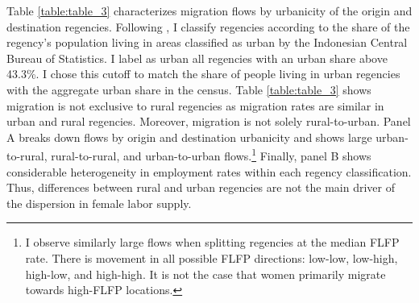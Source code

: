 Table \ref{table:table_3} characterizes migration flows by urbanicity of the origin and destination regencies. Following \cite{Bryan2019},  I classify regencies according to the share of the regency's population living in areas classified as urban by the Indonesian Central Bureau of Statistics. I label as urban all regencies with an urban share above 43.3\%. 
I chose this cutoff to match the share of people living in urban regencies with the aggregate urban share in the census. Table \ref{table:table_3} shows migration is not exclusive to rural regencies as migration rates are similar in urban and rural regencies. Moreover, migration is not solely rural-to-urban. Panel A breaks down flows by origin and destination urbanicity and shows large urban-to-rural, rural-to-rural, and urban-to-urban flows.\footnote{I observe similarly large flows when splitting regencies at the median FLFP rate. There is movement in all possible FLFP directions: low-low, low-high, high-low, and high-high. It is not the case that women primarily migrate towards high-FLFP locations.} Finally, panel B shows considerable heterogeneity in employment rates within each regency classification. Thus, differences between rural and urban regencies are not the main driver of the dispersion in female labor supply.


\tftext{}


\tftext{}


\tftext{}